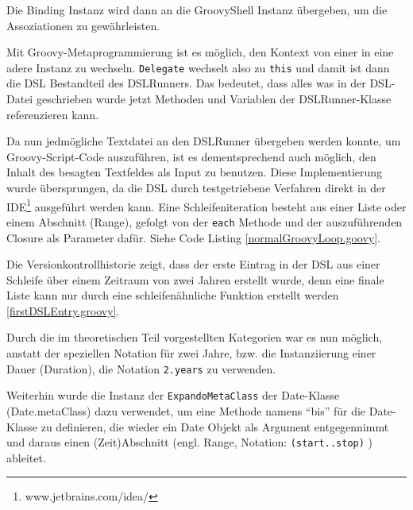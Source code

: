 \documentclass[11pt,english,ngerman, headsepline]{scrreprt}
\begin{document}
  Die Binding Instanz wird dann an die GroovyShell
Instanz übergeben, um die Assoziationen zu gewährleisten.

Mit Groovy-Metaprogrammierung ist es möglich, den Kontext von einer in eine adere Instanz zu
wechseln. \texttt{Delegate} wechselt also zu
\texttt{this} und damit ist dann die DSL Bestandteil des DSLRunners. Das
bedeutet, dass alles was in der DSL-Datei geschrieben wurde jetzt Methoden und
Variablen der DSLRunner-Klasse referenzieren kann.
 


Da nun jedmögliche Textdatei an den DSLRunner übergeben werden konnte, um
Groovy-Script-Code auszuführen, ist es dementsprechend auch möglich, den Inhalt
des besagten Textfeldes als Input zu benutzen. Diese Implementierung
wurde übersprungen, da die DSL durch testgetriebene Verfahren
\cite{beck2002driven} direkt in der IDE\footnote{www.jetbrains.com/idea/ }
ausgeführt werden kann.
 Eine Schleifeniteration besteht aus einer Liste oder
einem Abschnitt (Range), gefolgt von der \texttt{each} Methode und der
auszuführenden Closure als Parameter dafür. Siehe Code Listing \ref{normalGroovyLoop.goovy}. 



Die Versionkontrollhistorie zeigt, dass der erste Eintrag in der DSL aus einer
Schleife über einem Zeitraum von zwei Jahren erstellt wurde, denn eine finale
Liste kann nur durch eine schleifenähnliche Funktion erstellt werden
\ref{firstDSLEntry.groovy}.



Durch die im theoretischen Teil vorgestellten Kategorien war es nun möglich,
anstatt der speziellen Notation für zwei Jahre, bzw. die Instanziierung einer
Dauer (Duration), die Notation \texttt{2.years} zu verwenden. 

Weiterhin wurde die Instanz
der \texttt{ExpandoMetaClass} der Date-Klasse (Date.metaClass) dazu verwendet,
um eine Methode namens ``bis'' für die Date-Klasse zu definieren, die wieder ein Date
Objekt als Argument entgegennimmt und daraus einen (Zeit)Abschnitt (engl.
Range, Notation: \texttt{(start..stop)}  ) ableitet.
\end{document}
